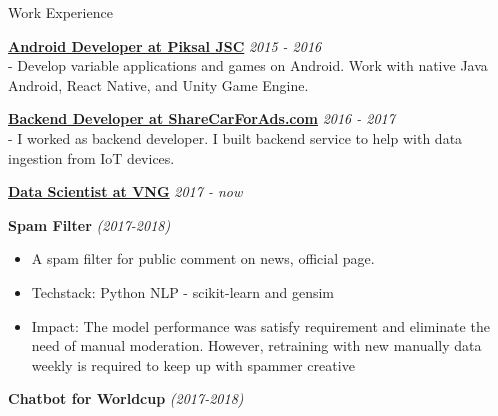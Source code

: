 \documentclass{resume} %
\begin{document}
\begin{rSection}{Work Experience}

{\bf \underline{Android Developer at Piksal JSC}} \hfill {\em 2015 - 2016}\\
- Develop variable applications and games on Android. Work with native Java Android, React Native, and Unity Game Engine. 

{\bf \underline{Backend Developer at ShareCarForAds.com}} \hfill {\em 2016 - 2017}\\
- I worked as backend developer. I built backend service to help with data ingestion from IoT devices. 

{\bf \underline{Data Scientist at VNG}} \hfill {\em 2017 - now}

\textbf{Spam Filter} \textit{(2017-2018)}

\begin{itemize}
    \item A spam filter for public comment on news, official page.
    \item Techstack: Python NLP - scikit-learn and gensim
    \item Impact: The model performance was satisfy requirement and eliminate the need of manual moderation. However, retraining with new manually data weekly is required to keep up with spammer creative
\end{itemize}




\textbf{Chatbot for Worldcup} \textit{(2017-2018)}


\end{rSection}
\end{document}
